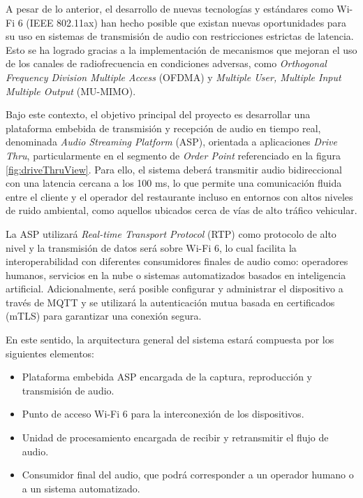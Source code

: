 \documentclass[
11pt, %
]{charter}
\newcommand{\driveThru}{\textit{Drive Thru}}
\newcommand{\orderPoint}{\textit{Order Point}}
\begin{document}
A pesar de lo anterior, el desarrollo de nuevas tecnologías y estándares como Wi-Fi 6 (IEEE 802.11ax) han hecho posible que existan nuevas oportunidades para su uso en sistemas de transmisión de audio con restricciones estrictas de latencia. Esto se ha logrado gracias a la implementación de mecanismos que mejoran el uso de los canales de radiofrecuencia en condiciones adversas, como \textit{Orthogonal Frequency Division Multiple Access} (OFDMA) y \textit{Multiple User, Multiple Input Multiple Output} (MU-MIMO).

Bajo este contexto, el objetivo principal del proyecto es desarrollar una plataforma embebida de transmisión y recepción de audio en tiempo real, denominada \textit{Audio Streaming Platform} (ASP), orientada a aplicaciones \driveThru{}, particularmente en el segmento de \orderPoint{} referenciado en la figura \ref{fig:driveThruView}. Para ello, el sistema deberá transmitir audio bidireccional con una latencia cercana a los 100 ms, lo que permite una comunicación fluida entre el cliente y el operador del restaurante incluso en entornos con altos niveles de ruido ambiental, como aquellos ubicados cerca de vías de alto tráfico vehicular.

La ASP utilizará \textit{Real-time Transport Protocol} (RTP) como protocolo de alto nivel y la transmisión de datos será sobre Wi-Fi 6, lo cual facilita la interoperabilidad con diferentes consumidores finales de audio como: operadores humanos, servicios en la nube o sistemas automatizados basados en inteligencia artificial. Adicionalmente, será posible configurar y administrar el dispositivo a través de MQTT y se utilizará la autenticación mutua basada en certificados (mTLS) para garantizar una conexión segura.

En este sentido, la arquitectura general del sistema estará compuesta por los siguientes elementos:

\begin{itemize}
\item Plataforma embebida ASP encargada de la captura, reproducción y transmisión de audio.
\item Punto de acceso Wi-Fi 6 para la interconexión de los dispositivos.
\item Unidad de procesamiento encargada de recibir y retransmitir el flujo de audio.
\item Consumidor final del audio, que podrá corresponder a un operador humano o a un sistema automatizado.
\end{itemize}
\end{document}
